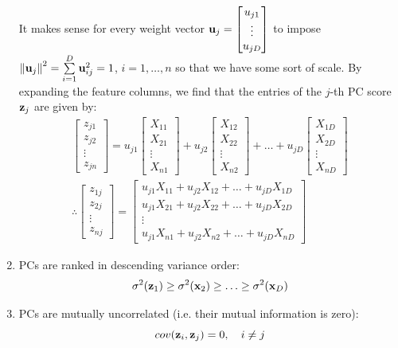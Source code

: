 \documentclass[a4paper]{article}
\begin{document}
\begin{enumerate}
		It makes sense for every weight vector $\textbf{u}_j = \begin{bmatrix}u_{j1}  \\ \vdots\\ u_{jD} \end{bmatrix}$ to impose $\left\lVert\textbf{u}_j\right\rVert^2 = \sum\limits_{i=1}^D \textbf{u}_{ij}^2=1$, $i=1,\ldots,n$ so that we have some sort of scale. By expanding the feature columns, we find that the entries of the $j$-th PC score $\textbf{z}_j$ are given by:
		\begin{align}
		    \begin{bmatrix}
		     z_{j1} \\ z_{j2} \\ \vdots \\ z_{jn}
		    \end{bmatrix}
		    =
		    u_{j1}\begin{bmatrix}X_{11} \\ X_{21} \\ \vdots \\ X_{n1}  \end{bmatrix} + 
    		u_{j2}\begin{bmatrix}X_{12} \\ X_{22} \\ \vdots \\ X_{n2}  \end{bmatrix} + \ldots +    		u_{jD}\begin{bmatrix}X_{1D} \\ X_{2D} \\ \vdots \\ X_{nD}  \end{bmatrix} \\
    		\therefore 
    	    \begin{bmatrix}
    	    z_{1j} \\ z_{2j} \\ \vdots \\ z_{nj}
    	    \end{bmatrix} = 
    	   \begin{bmatrix}
            u_{j1}X_{11} + u_{j2}X_{12} + \ldots + u_{jD}X_{1D}\\
            u_{j1}X_{21} + u_{j2}X_{22} + \ldots + u_{jD}X_{2D}\\
            \vdots \\
            u_{j1}X_{n1} + u_{j2}X_{n2} + \ldots + u_{jD}X_{nD}
    	   \end{bmatrix} \label{eq:pca_alg_form}
		\end{align}
			\item PCs are ranked in descending variance order:
		\begin{equation}
			\sigma^2(\textbf{z}_1) \geq \sigma^2(\textbf{x}_2) \geq \ldots \geq \sigma^2(\textbf{x}_D)
		\end{equation}
	\item PCs are mutually uncorrelated (i.e. their mutual information is zero):
		\begin{equation}
			cov(\textbf{z}_i, \textbf{z}_j) = 0, \quad i \neq j	
		\end{equation}
\end{enumerate}
\end{document}
